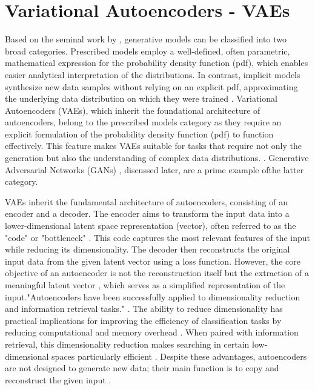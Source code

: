\section{Variational Autoencoders - VAEs}
\label{VAEs}

Based on the seminal work by \citeauthor{diggleImplicitPrescribed}, generative models can be classified into two broad categories. Prescribed models employ a well-defined, often parametric, mathematical expression for the probability density function (pdf), which enables easier analytical interpretation of the distributions. In contrast, implicit models synthesize new data samples without relying on an explicit pdf, approximating the underlying data distribution on which they were trained \citep{diggleImplicitPrescribed}. Variational Autoencoders (VAEs), which inherit the foundational architecture of autoencoders, belong to the prescribed models category as they require an explicit formulation of the probability density function (pdf) to function effectively. This feature makes VAEs suitable for tasks that require not only the generation but also the understanding of complex data distributions. \citep{kingmaVAE,rezendeVAE,GoodfellowDeepLearning}. Generative Adversarial Networks (GANs) \citep{goodfellowGAN}, discussed later, are a prime example ofthe latter category.

VAEs inherit the fundamental architecture of autoencoders, consisting of an encoder and a decoder. The encoder aims to transform the input data into a lower-dimensional latent space representation (vector), often referred to as the "code" or "bottleneck" \citep{hintonCode, GoodfellowDeepLearning}. This code captures the most relevant features of the input while reducing its dimensionality. The decoder then reconstructs the original input data from the given latent vector using a loss function. However, the core objective of an autoencoder is not the reconstruction itself but the extraction of a meaningful latent vector \citep{GoodfellowDeepLearning}, which serves as a simplified representation of the input."Autoencoders have been successfully applied to dimensionality reduction and information retrieval tasks." \citep{GoodfellowDeepLearning}. The ability to reduce dimensionality has practical implications for improving the efficiency of classification tasks by reducing computational and memory overhead \citep{GoodfellowDeepLearning}. When paired with information retrieval, this dimensionality reduction makes searching in certain low-dimensional spaces particularly efficient \citep{GoodfellowDeepLearning}. Despite these advantages, autoencoders are not designed to generate new data; their main function is to copy and reconstruct the given input \citep{GoodfellowDeepLearning}.

